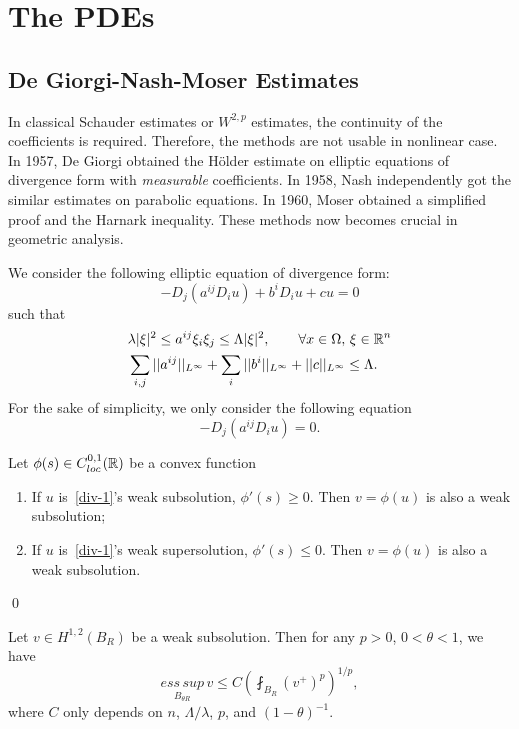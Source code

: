 
\chapter{The PDEs}\label{PDEs}
\section{De Giorgi-Nash-Moser Estimates}\label{Moser_iteration}
In classical Schauder estimates or $W^{2,p}$ estimates, the continuity of the coefficients is required. Therefore, the methods are not usable in nonlinear case. In 1957, De Giorgi obtained the H\"older estimate on elliptic equations of divergence form with {\it measurable} coefficients. In 1958, Nash independently got the similar estimates on parabolic equations. In 1960, Moser obtained a simplified proof and the Harnark inequality. These methods now becomes  crucial in geometric analysis.



We consider the following elliptic equation of divergence form:
\begin{equation}\label{div}
-D_j(a^{ij}D_iu)+b^iD_i u+cu=0
\end{equation}
such that 
\begin{align*}
& \lambda|\xi|^2\leq a^{ij}\xi_i\xi_j\leq\Lambda|\xi|^2,\qquad \forall x\in\Omega,\,\xi\in\mathbb R^n
\\
&\sum_{i,j}||a^{ij}||_{L^\infty}+\sum_i||b^i||_{L^\infty}+||c||_{L^\infty}\leq\Lambda.
\end{align*}
For the sake of simplicity, we only consider the following equation
\begin{equation}\label{div-1}
-D_j(a^{ij}D_iu)=0.
\end{equation}

\begin{lemma} Let $\phi(s)\in C_{loc}^{0,1}(\mathbb R)$ be a convex function
\begin{enumerate}
\item If $u$ is~\eqref{div-1}'s weak subsolution, $\phi'(s)\geq 0$. Then $v=\phi(u)$ is also a weak subsolution;
\item If $u$ is~\eqref{div-1}'s weak supersolution, $\phi'(s)\leq 0$. Then $v=\phi(u)$ is also a weak subsolution.
\end{enumerate}
\end{lemma}

\qed

\begin{lemma} Let $v\in H^{1,2}(B_R)$ be a weak subsolution. Then for 
any $p>0$, $0<\theta<1$, we have
\[
\underset{{B_{\theta R}}}{ess\,sup}\, v\leq C\left(\fint_{B_R}(v^+)^p\right)^{1/p},
\]
where $C$ only depends on $n$, $\Lambda/\lambda$, $p$, and $(1-\theta)^{-1}$.
\end{lemma}

